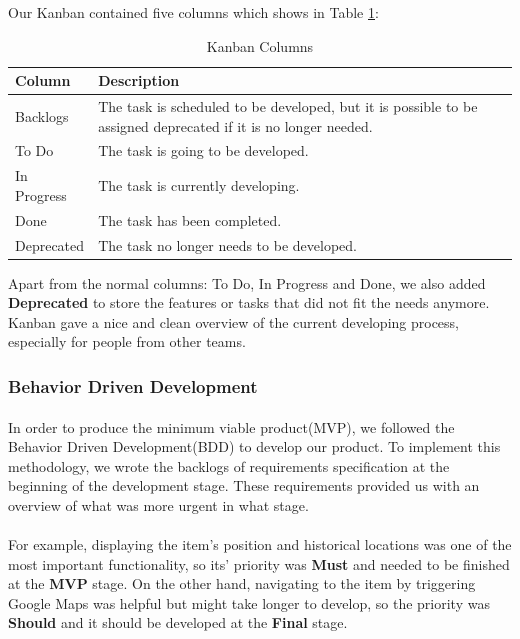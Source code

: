 \documentclass[12pt,a4paper]{article}
\begin{document}
          Our Kanban contained five columns which shows in Table \ref{table:Kanban Columns}:
          
          \begin{table}[H]
            \centering
              \begin{tabularx}{\textwidth}{l X}
                \hline
                Column & Description  \\ \hline
                Backlogs & The task is scheduled to be developed, but it is possible to be assigned deprecated if it is no longer needed. \\ 
                To Do & The task is going to be developed.  \\ 
                In Progress & The task is currently developing.  \\ 
                Done & The task has been completed.   \\ 
                Deprecated & The task no longer needs to be developed.\\                  
                \hline
              \end{tabularx}
              \caption[Table caption text]{Kanban Columns}
              \label{table:Kanban Columns}
          \end{table}
          
          Apart from the normal columns: To Do, In Progress and Done, we also added {\bf Deprecated} to store the features or tasks that did not fit the needs anymore. Kanban gave a nice and clean overview of the current developing process, especially for people from other teams.
        
        \subsubsection{Behavior Driven Development}
          \paragraph{}In order to produce the minimum viable product(MVP), we followed the Behavior Driven Development(BDD) to develop our product. To implement this methodology, we wrote the backlogs of requirements specification at the beginning of the development stage. These requirements provided us with an overview of what was more urgent in what stage. 

          \paragraph{}For example, displaying the item's position and historical locations was one of the most important functionality, so its' priority was {\bf Must} and needed to be finished at the {\bf MVP} stage. On the other hand, navigating to the item by triggering Google Maps was helpful but might take longer to develop, so the priority was {\bf Should} and it should be developed at the {\bf Final} stage. 
          
\end{document}
